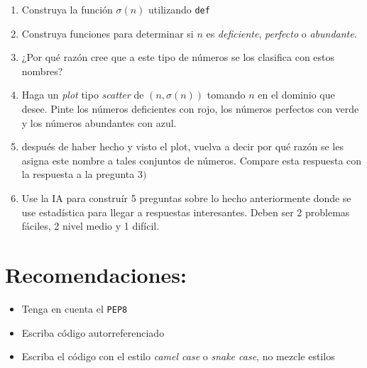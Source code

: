 \documentclass[a4paper]{article}
\begin{document}
\begin{enumerate}
    \item Construya la función $\sigma(n)$ utilizando \texttt{def}
    \item Construya funciones para determinar si $n$ es \textit{deficiente}, \textit{perfecto} o \textit{abundante}.
    \item ¿Por qué razón cree que a este tipo de números se los clasifica con estos nombres?
    \item Haga un \textit{plot} tipo \textit{scatter} de $(n, \sigma(n))$ tomando $n$ en el dominio que desee. Pinte los números deficientes con rojo, los números perfectos con verde y los números abundantes con azul.
    \item después de haber hecho y visto el plot, vuelva a decir por qué razón se les asigna este nombre a tales conjuntos de números. Compare esta respuesta con la respuesta a la pregunta $3)$
    \item Use la IA para construír 5 preguntas sobre lo hecho anteriormente donde se use estadística para llegar a respuestas interesantes. Deben ser 2 problemas fáciles, 2 nivel medio y 1 difícil.
\end{enumerate}


\section{Recomendaciones:}

\begin{itemize}
    \item Tenga en cuenta el \texttt{PEP8}
    \item Escriba código autorreferenciado
    \item Escriba el código con el estilo \textit{camel case} o \textit{snake case}, no mezcle estilos
\end{itemize}
\end{document}
